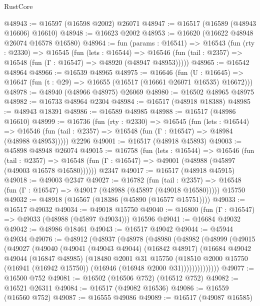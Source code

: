 \begin{lexlean}{RustCore}
\begin{coremodule}
@48943 := @16597 (@16598 @2002) @26071
@48947 := @16517 (@16589 (@48943 @16606) @16610)
@48948 := @16623 @2002
@48953 := @16620 (@16622 @48948 @26074 @16578 @16580)
@48964 := fun (params : @16541) =>
  @16543
    (fun (rty : @2330) =>
    @16545
      (fun (lets : @16544) =>
      @16546 (fun (tail : @2357) => @16548 (fun (Γ : @16547) => @48920 (@48947 @48953)))))
@48965 := @16542 @48964
@48966 := @16539 @48965
@48975 := @16646
    (fun (U : @16645) => @16647 (fun (t : @29) => @16655 (@16517 (@16661 @26071 @16535) @16672)))
@48978 := @48940 (@48966 @48975) @26069
@48980 := @16502 @48965 @48975
@48982 := @16733 @48964 @2304
@48984 := @16517 (@48918 @18388)
@48985 := @48943 @18391
@48986 := @16589 @48985
@48988 := @16517 (@48986 @16610)
@48999 := @16736
    (fun (rty : @2330) =>
    @16545
      (fun (lets : @16544) =>
      @16546 (fun (tail : @2357) => @16548 (fun (Γ : @16547) => @48984 (@48988 @48953)))))
    @2296
@49001 := @16517 (@48918 @45893)
@49003 := @45898 @48948 @26074
@49015 := @16758
    (fun (lets : @16544) =>
    @16546
      (fun (tail : @2357) =>
      @16548 (fun (Γ : @16547) => @49001 (@48988 (@45897 (@49003 @16578 @16580))))))
    @2347
@49017 := @16517 (@48918 @45915)
@49018 := @49003 @2347
@49027 := @16782
    (fun (tail : @2357) => @16548 (fun (Γ : @16547) => @49017 (@48988 (@45897 (@49018 @16580)))))
    @15750
@49032 := @48918 (@16567 (@18386 (@45890 (@16577 @15751))))
@49033 := @16517 @49032
@49034 := @49018 @15750
@49040 := @16800 (fun (Γ : @16547) => @49033 (@48988 (@45897 @49034))) @16596
@49041 := @16684 @49032
@49042 := @48986 @18461
@49043 := @16517 @49042
@49044 := @45944 @49034
@49076 := @48912
    (@48937
      (@48978
        (@48980
          (@48982
            (@48999
              (@49015
                (@49027
                  (@49040
                    (@49041
                      (@49043 @49044)
                      (@16842 @48917)
                      (@16684
                        @49042
                        @49044
                        (@16847 @48985)
                        (@18480
                          @2001
                          @31
                          @15750
                          (@18510
                            @2000
                            @15750
                            (@16941 (@16942 @15750))
                            (@16946 (@16948 @2000 @31))))))))))))))
@49077 := @16500 @752
@49081 := @16502 (@16506 @752) (@16512 @752)
@49082 := @16521 @26311
@49084 := @16517 (@49082 @16536)
@49086 := @16559 (@16560 @752)
@49087 := @16555 @49086
@49089 := @16517 (@49087 @16585)

\end{coremodule}
\end{lexlean}

